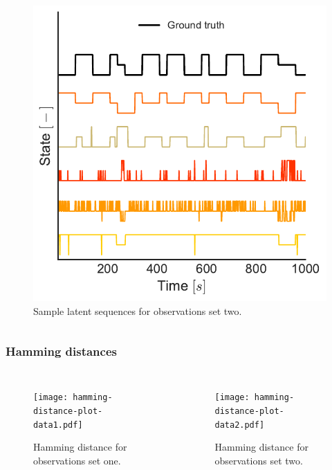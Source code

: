\documentclass[aspectratio=169]{beamer}
\begin{document}
\begin{frame}
\begin{columns}[c]
        \begin{figure}
            \includegraphics[width=1.0\linewidth]{state-seq-data2.pdf}
            \caption{Sample latent sequences for observations set two.}
        \end{figure}

    \end{columns}

\end{frame}


\begin{frame}
    \frametitle{Hamming distances}

    \begin{columns}[c] 


        \begin{figure}
            \texttt{[image: hamming-distance-plot-data1.pdf]}
            \caption{Hamming distance for observations set one.}
        \end{figure}


        \begin{figure}
            \texttt{[image: hamming-distance-plot-data2.pdf]}
            \caption{Hamming distance for observations set two.}
        \end{figure}

    \end{columns}

\end{frame}
\end{document}
